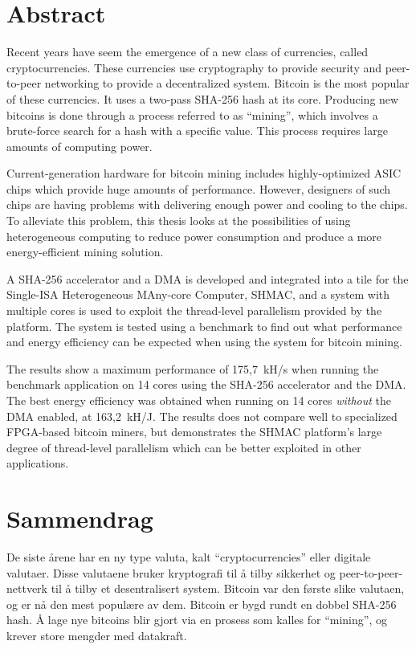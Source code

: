\chapter*{Abstract}

Recent years have seem the emergence of a new class of currencies, called
cryptocurrencies. These currencies use cryptography to provide security
and peer-to-peer networking to provide a decentralized system. Bitcoin is
the most popular of these currencies. It uses a two-pass
SHA-256 hash at its core. Producing new bitcoins is done through a process
referred to as ``mining'', which involves a brute-force search for a hash with
a specific value. This process requires large amounts of computing power.

Current-generation hardware for bitcoin mining includes highly-optimized
ASIC chips which provide huge amounts of performance. However, designers of
such chips are having problems with delivering enough power and cooling
to the chips. To alleviate this problem, this thesis looks at the possibilities
of using heterogeneous computing to reduce power consumption and produce a more
energy-efficient mining solution.

A SHA-256 accelerator and a DMA is developed and integrated into a tile for
the Single-ISA Heterogeneous MAny-core Computer, SHMAC, and a system with
multiple cores is used to exploit the thread-level parallelism provided by
the platform. The system is tested using a benchmark to find out what performance
and energy efficiency can be expected when using the system for bitcoin mining.

The results show a maximum performance of 175,7~kH/s when running the benchmark
application on 14 cores using the SHA-256 accelerator and the DMA. The best
energy efficiency was obtained when running on 14 cores \emph{without} the DMA enabled,
at 163,2~kH/J. The results does not compare well to specialized FPGA-based
bitcoin miners, but demonstrates the SHMAC platform's large degree of thread-level parallelism
which can be better exploited in other applications.

\chapter*{Sammendrag}

De siste årene har en ny type valuta, kalt ``cryptocurrencies'' eller digitale valutaer. Disse valutaene
bruker kryptografi til å tilby sikkerhet og peer-to-peer-nettverk til å tilby et
desentralisert system. Bitcoin var den første slike valutaen, og er nå den mest
populære av dem. Bitcoin er bygd rundt en dobbel SHA-256 hash. Å lage nye bitcoins
blir gjort via en prosess som kalles for ``mining'', og krever store mengder med
datakraft.

